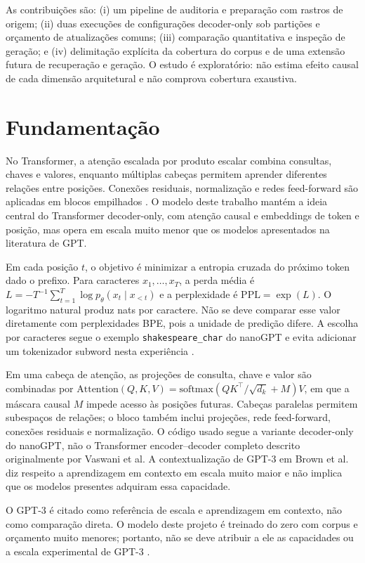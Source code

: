 \documentclass[conference]{IEEEtran}
\begin{document}
As contribuições são: (i) um pipeline de auditoria e preparação com rastros de origem; (ii) duas execuções de configurações decoder-only sob partições e orçamento de atualizações comuns; (iii) comparação quantitativa e inspeção de geração; e (iv) delimitação explícita da cobertura do corpus e de uma extensão futura de recuperação e geração. O estudo é exploratório: não estima efeito causal de cada dimensão arquitetural e não comprova cobertura exaustiva.

\section{Fundamentação}

No Transformer, a atenção escalada por produto escalar combina consultas, chaves e valores, enquanto múltiplas cabeças permitem aprender diferentes relações entre posições. Conexões residuais, normalização e redes feed-forward são aplicadas em blocos empilhados \cite{vaswani2017}. O modelo deste trabalho mantém a ideia central do Transformer decoder-only, com atenção causal e embeddings de token e posição, mas opera em escala muito menor que os modelos apresentados na literatura de GPT.

Em cada posição $t$, o objetivo é minimizar a entropia cruzada do próximo token dado o prefixo. Para caracteres $x_1,\ldots,x_T$, a perda média é $L=-T^{-1}\sum_{t=1}^{T}\log p_\theta(x_t\mid x_{<t})$ e a perplexidade é $\mathrm{PPL}=\exp(L)$. O logaritmo natural produz nats por caractere. Não se deve comparar esse valor diretamente com perplexidades BPE, pois a unidade de predição difere. A escolha por caracteres segue o exemplo \texttt{shakespeare\_char} do nanoGPT e evita adicionar um tokenizador subword nesta experiência \cite{karpathyNanoGPT,karpathyTutorial}.

Em uma cabeça de atenção, as projeções de consulta, chave e valor são combinadas por $\mathrm{Attention}(Q,K,V)=\mathrm{softmax}(QK^\top/\sqrt{d_k}+M)V$, em que a máscara causal $M$ impede acesso às posições futuras. Cabeças paralelas permitem subespaços de relações; o bloco também inclui projeções, rede feed-forward, conexões residuais e normalização. O código usado segue a variante decoder-only do nanoGPT, não o Transformer encoder--decoder completo descrito originalmente por Vaswani et al. A contextualização de GPT-3 em Brown et al. diz respeito a aprendizagem em contexto em escala muito maior e não implica que os modelos presentes adquiram essa capacidade.

O GPT-3 é citado como referência de escala e aprendizagem em contexto, não como comparação direta. O modelo deste projeto é treinado do zero com corpus e orçamento muito menores; portanto, não se deve atribuir a ele as capacidades ou a escala experimental de GPT-3 \cite{brown2020}.
\end{document}
